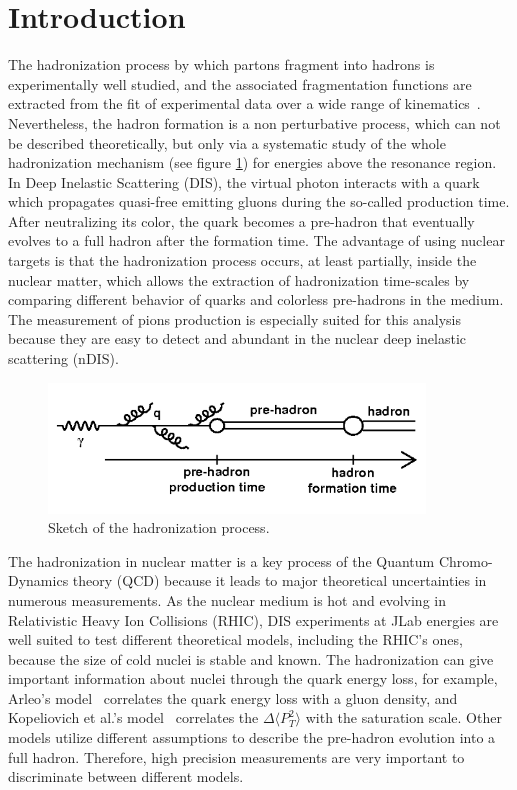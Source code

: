 
\section{Introduction}
\label{physics}

The hadronization process by which partons fragment into hadrons is 
experimentally well studied, and the associated fragmentation functions are extracted from the fit of experimental data over a wide range of kinematics~\cite{Albino:2008fy}. Nevertheless, the hadron formation is a non perturbative process, which can not be described theoretically, but only via a systematic study of the whole hadronization mechanism (see figure \ref{fig:hadro}) for energies above the resonance region. In Deep Inelastic Scattering (DIS), the virtual photon interacts with a quark which propagates quasi-free emitting gluons during the so-called production time. After neutralizing its color, the quark becomes a pre-hadron that eventually evolves to a full hadron after the formation time. The advantage of using nuclear targets is that the hadronization process occurs, at least partially, inside the nuclear matter, which allows the extraction of hadronization time-scales by comparing different behavior of quarks and colorless pre-hadrons in the medium. The measurement of pions production is especially suited for this analysis because they are easy to detect and abundant in the nuclear deep inelastic scattering (nDIS).

\begin{figure}[htbp]
\centering
\includegraphics[width=10cm] {fig/hadro.png} 
\caption {Sketch of the hadronization process.}
\label{fig:hadro}
\end{figure}

The hadronization in nuclear matter is a key process of the Quantum Chromo-Dynamics theory (QCD) because it leads to major theoretical uncertainties in numerous measurements. As the nuclear medium is hot and evolving in Relativistic Heavy Ion Collisions (RHIC), DIS experiments at JLab energies are well suited to test different theoretical models, including the RHIC's ones, because the size of cold nuclei is stable and known. The hadronization can give important information about nuclei through the quark energy loss, for example, Arleo's model~\cite{Arleo:2003yf} correlates the quark energy loss with a gluon density, and Kopeliovich et al.'s model~\cite{Kopeliovich:2010aa} correlates the $\Delta \langle P_T^2 \rangle$ with the saturation scale. Other models \cite{Gallmeister:2007an} utilize different assumptions to describe the pre-hadron evolution into a full hadron. Therefore, high precision measurements are very important to discriminate between different models. 

